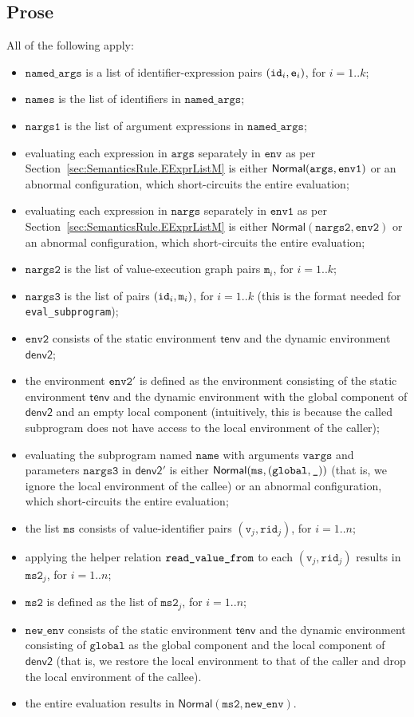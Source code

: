 \documentclass{book}
\newcommand\secref[1]{Section~\ref{sec:#1}}
\newcommand\tenv[0]{\textsf{tenv}}
\newcommand\denvtwo[0]{\textsf{denv2}}
\newcommand\ProseOrAbnormal[0]{or an abnormal configuration, which short-circuits the entire evaluation}
\newcommand\Normal[0]{\textsf{Normal}}
\newcommand\newenv[0]{\texttt{new\_env}}
\newcommand\env[0]{\texttt{env}}
\newcommand\envone[0]{\texttt{env1}}
\newcommand\envtwo[0]{\texttt{env2}}
\newcommand\vm[0]{\texttt{m}}
\newcommand\vv[0]{\texttt{v}}
\newcommand\vms[0]{\texttt{ms}}
\newcommand\vmstwo[0]{\texttt{ms2}}
\newcommand\name[0]{\texttt{name}}
\newcommand\args[0]{\texttt{args}}
\newcommand\namedargs[0]{\texttt{named\_args}}
\newcommand\nargs[0]{\texttt{nargs}}
\newcommand\nargsone[0]{\texttt{nargs1}}
\newcommand\nargstwo[0]{\texttt{nargs2}}
\newcommand\nargsthree[0]{\texttt{nargs3}}
\newcommand\vvargs[0]{\texttt{vargs}}
\newcommand\names[0]{\texttt{names}}
\newcommand\vglobal[0]{\texttt{global}}
\newcommand\rid[0]{\texttt{rid}}
\begin{document}
\subsection{Prose}
All of the following apply:
\begin{itemize}
  \item $\namedargs$ is a list of identifier-expression pairs $(\texttt{id}_i, \texttt{e}_i)$, for $i=1..k$;
  \item $\names$ is the list of identifiers in $\namedargs$;
  \item $\nargsone$ is the list of argument expressions in $\namedargs$;
  \item evaluating each expression in $\args$ separately in $\env$ as per \secref{SemanticsRule.EExprListM}
  is either $\Normal(\vargs, \envone)$ \ProseOrAbnormal;
  \item evaluating each expression in $\nargs$ separately in $\envone$ as per \secref{SemanticsRule.EExprListM}
  is either $\Normal(\nargstwo, \envtwo)$ \ProseOrAbnormal;
  \item $\nargstwo$ is the list of value-execution graph pairs $\vm_i$, for $i=1..k$;
  \item $\nargsthree$ is the list of pairs $(\id_i, \vm_i)$, for $i=1..k$ (this is the format needed
  for \texttt{eval\_subprogram});
  \item $\envtwo$ consists of the static environment $\tenv$ and the dynamic environment $\denvtwo$;
  \item the environment $\envtwo'$ is defined as the environment
  consisting of the static environment $\tenv$ and the dynamic environment with the global component
  of $\denvtwo$ and an empty local component (intuitively, this is because the called subprogram does not have access
  to the local environment of the caller);
  \item evaluating the subprogram named $\name$ with arguments $\vvargs$ and parameters $\nargsthree$ in
  $\denvtwo'$ is either $\Normal(\vms, (\vglobal, \Ignore))$ (that is, we ignore the local environment
  of the callee) \ProseOrAbnormal;
  \item the list $\vms$ consists of value-identifier pairs $(\vv_j, \rid_j)$, for $i=1..n$;
  \item applying the helper relation $\texttt{read\_value\_from}$ to each $(\vv_j, \rid_j)$
  results in $\vmstwo_j$, for $i=1..n$;
  \item $\vmstwo$ is defined as the list of $\vmstwo_j$, for $i=1..n$;
  \item $\newenv$ consists of the static environment $\tenv$ and the dynamic environment consisting
  of $\vglobal$ as the global component and the local component of $\denvtwo$ (that is, we restore
  the local environment to that of the caller and drop the local environment of the callee).
  \item the entire evaluation results in $\Normal(\vmstwo, \newenv)$.
\end{itemize}
\end{document}
